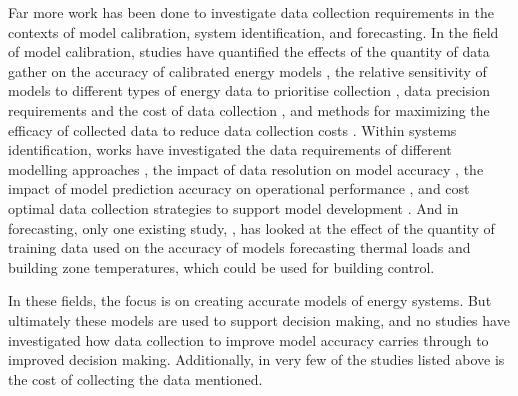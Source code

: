 Far more work has been done to investigate data collection requirements in the contexts of model calibration, system identification, and forecasting. In the field of model calibration, studies have quantified the effects of the quantity of data gather on the accuracy of calibrated energy models , the relative sensitivity of models to different types of energy data to prioritise collection , data precision requirements and the cost of data collection , and methods for maximizing the efficacy of collected data to reduce data collection costs . Within systems identification, works have investigated the data requirements of different modelling approaches , the impact of data resolution on model accuracy , the impact of model prediction accuracy on operational performance , and cost optimal data collection strategies to support model development . And in forecasting, only one existing study, , has looked at the effect of the quantity of training data used on the accuracy of models forecasting thermal loads and building zone temperatures, which could be used for building control.

In these fields, the focus is on creating accurate models of energy systems. But ultimately these models are used to support decision making, and no studies have investigated how data collection to improve model accuracy carries through to improved decision making. Additionally, in very few of the studies listed above is the cost of collecting the data mentioned.\\

